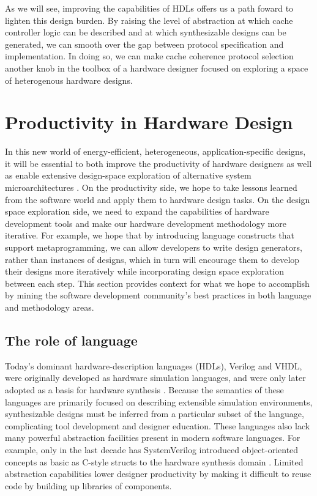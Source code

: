 As we will see, improving the capabilities of HDLs offers us a path foward to lighten this design burden.
By raising the level of abstraction at which cache controller logic can be described and at which synthesizable designs can be generated,
we can smooth over the gap between protocol specification and implementation.
In doing so, we can make cache coherence protocol selection another knob in the toolbox of a hardware designer focused on exploring a space of heterogenous hardware designs.

\section{Productivity in Hardware Design}

In this new world of energy-efficient, heterogeneous, application-specific designs, it will be essential to both improve the productivity of hardware designers as well as enable extensive design-space exploration of alternative system microarchitectures \cite{shacham-micro10}.
On the productivity side, we hope to take lessons learned from the software world and apply them to hardware design tasks.
On the design space exploration side, we need to expand the capabilities of hardware development tools and make our hardware development methodology more iterative.
For example, we hope that by introducing language constructs that support metaprogramming, 
we can allow developers to write design generators, rather than instances of designs,
which in turn will encourage them to develop their designs more iteratively while
incorporating design space exploration between each step.
This section provides context for what we hope to accomplish by mining the software development community's best practices in both language and methodology areas.

\subsection{The role of language}

Today's dominant hardware-description languages (HDLs), Verilog and VHDL, were originally developed as hardware simulation languages,
and were only later adopted as a basis for hardware synthesis \cite{palnitkar2003verilog}.
Because the semantics of these languages are primarily focused on describing extensible simulation environments,
synthesizable designs must be inferred from a particular subset of the language, complicating tool development and designer education. 
These languages also lack many powerful abstraction facilities present in modern software languages.
For example, only in the last decade has SystemVerilog introduced object-oriented concepts as basic as C-style structs to the hardware synthesis domain \cite{sutherland2006systemverilog}.
Limited abstraction capabilities lower designer productivity by making it difficult to reuse code by building up libraries of components.

